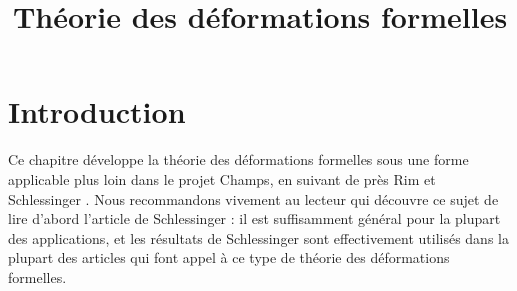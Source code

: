 


%


\title{Théorie des déformations formelles}


\maketitle

\label{section-phantom}

\tableofcontents



\section{Introduction}
\label{section-introduction}

\noindent
Ce chapitre développe la théorie des déformations formelles sous une forme
applicable plus loin dans le projet Champs, en suivant de près Rim
\cite[Exposee VI]{SGA7-I} et Schlessinger \cite{Sch}. Nous recommandons vivement
au lecteur qui découvre ce sujet de lire d'abord l'article de Schlessinger :
il est suffisamment général pour la plupart des applications, et les résultats
de Schlessinger sont effectivement utilisés dans la plupart des articles
qui font appel à ce type de théorie des déformations formelles.

